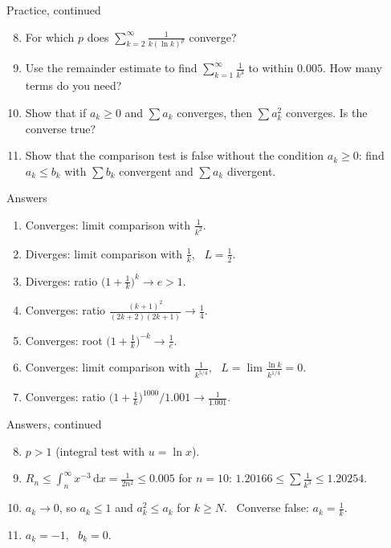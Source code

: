 \documentclass{wosm-slides}
\newcommand{\dx}{\,\mathrm{d}x}
\begin{document}
\begin{frame}{Practice, continued}
  \small
  \begin{enumerate}
    \setcounter{enumi}{7}
    \item For which $p$ does $\displaystyle\sum_{k=2}^\infty \frac{1}{k (\ln k)^p}$ converge?
    \item Use the remainder estimate to find $\sum_{k=1}^\infty \frac{1}{k^3}$ to within $0.005$.
      How many terms do you need?
    \item Show that if $a_k \ge 0$ and $\sum a_k$ converges, then $\sum a_k^2$ converges.
      Is the converse true?
    \item Show that the comparison test is false without the condition $a_k \ge 0$:
      find $a_k \le b_k$ with $\sum b_k$ convergent and $\sum a_k$ divergent.
  \end{enumerate}
\end{frame}

\begin{frame}{Answers}
  \small
  \begin{enumerate}
    \item Converges: limit comparison with $\frac1{k^2}$.
    \item Diverges: limit comparison with $\frac1k$, \ $L = \frac12$.
    \item Diverges: ratio $\bigl(1 + \frac1k\bigr)^k \to e > 1$.
    \item Converges: ratio $\frac{(k+1)^2}{(2k+2)(2k+1)} \to \frac14$.
    \item Converges: root $\bigl(1 + \frac1k\bigr)^{-k} \to \frac1e$.
    \item Converges: limit comparison with $\frac{1}{k^{5/4}}$, \
      $L = \lim \frac{\ln k}{k^{1/4}} = 0$.
    \item Converges: ratio $\bigl(1 + \frac1k\bigr)^{1000} / 1.001 \to \frac{1}{1.001}$.
  \end{enumerate}
\end{frame}

\begin{frame}{Answers, continued}
  \small
  \begin{enumerate}
    \setcounter{enumi}{7}
    \item $p > 1$ (integral test with $u = \ln x$).
    \item $R_n \le \int_n^\infty x^{-3}\dx = \frac{1}{2n^2} \le 0.005$ for $n = 10$:
      $1.20166 \le \sum \frac1{k^3} \le 1.20254$.
    \item $a_k \to 0$, so $a_k \le 1$ and $a_k^2 \le a_k$ for $k \ge N$. \
      Converse false: $a_k = \frac1k$.
    \item $a_k = -1$, \ $b_k = 0$.
  \end{enumerate}
\end{frame}
\end{document}

